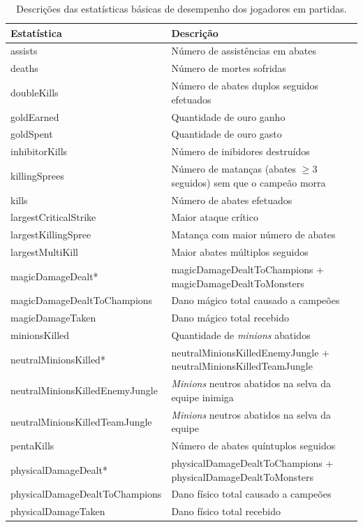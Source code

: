 \begin{table}
  \scriptsize
  \caption{Descrições das estatísticas básicas de desempenho dos jogadores em partidas.}
  \label{tab:features-desc}
  \begin{tabular}{p{}p{}}
    \toprule
    Estatística & Descrição \\
    \midrule
assists & Número de assistências em abates\\
deaths & Número de mortes sofridas \\
doubleKills & Número de abates duplos seguidos efetuados\\
goldEarned & Quantidade de ouro ganho\\
goldSpent & Quantidade de ouro gasto\\
inhibitorKills & Número de inibidores destruídos\\
killingSprees & Número de matanças (abates $\geq 3$ seguidos) sem que o campeão morra \\
kills & Número de abates efetuados\\
largestCriticalStrike & Maior ataque crítico\\
largestKillingSpree & Matança com maior número de abates\\
largestMultiKill & Maior abates múltiplos seguidos\\
magicDamageDealt* & magicDamageDealtToChampions +  magicDamageDealtToMonsters\\
magicDamageDealtToChampions & Dano mágico total causado a campeões\\
magicDamageTaken & Dano mágico total recebido\\
minionsKilled & Quantidade de \textit{minions} abatidos\\
neutralMinionsKilled* & neutralMinionsKilledEnemyJungle + neutralMinionsKilledTeamJungle\\
neutralMinionsKilledEnemyJungle & \textit{Minions} neutros abatidos na selva da equipe inimiga\\
neutralMinionsKilledTeamJungle & \textit{Minions} neutros abatidos na selva da equipe\\
pentaKills & Número de abates quíntuplos seguidos\\
physicalDamageDealt* & physicalDamageDealtToChampions + physicalDamageDealtToMonsters\\
physicalDamageDealtToChampions & Dano físico total causado a campeões\\
physicalDamageTaken & Dano físico total recebido\\

\end{tabular}
\end{table}
